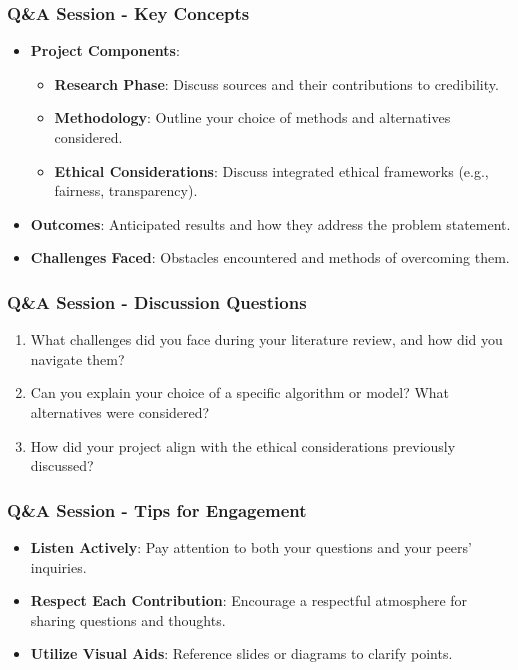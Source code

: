 \documentclass[aspectratio=169]{beamer}
\begin{document}
\begin{frame}[fragile]
    \frametitle{Q\&A Session - Key Concepts}
    \begin{itemize}
        \item \textbf{Project Components}:
            \begin{itemize}
                \item \textbf{Research Phase}: Discuss sources and their contributions to credibility.
                \item \textbf{Methodology}: Outline your choice of methods and alternatives considered.
                \item \textbf{Ethical Considerations}: Discuss integrated ethical frameworks (e.g., fairness, transparency).
            \end{itemize}
        \item \textbf{Outcomes}: Anticipated results and how they address the problem statement.
        \item \textbf{Challenges Faced}: Obstacles encountered and methods of overcoming them.
    \end{itemize}
\end{frame}

\begin{frame}[fragile]
    \frametitle{Q\&A Session - Discussion Questions}
    \begin{enumerate}
        \item What challenges did you face during your literature review, and how did you navigate them?
        \item Can you explain your choice of a specific algorithm or model? What alternatives were considered?
        \item How did your project align with the ethical considerations previously discussed?
    \end{enumerate}
\end{frame}

\begin{frame}[fragile]
    \frametitle{Q\&A Session - Tips for Engagement}
    \begin{itemize}
        \item \textbf{Listen Actively}: Pay attention to both your questions and your peers’ inquiries.
        \item \textbf{Respect Each Contribution}: Encourage a respectful atmosphere for sharing questions and thoughts.
        \item \textbf{Utilize Visual Aids}: Reference slides or diagrams to clarify points.
    \end{itemize}
\end{frame}
\end{document}
